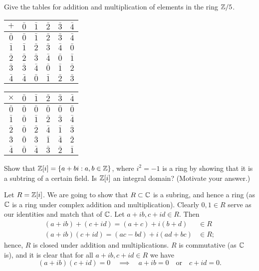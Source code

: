 \setcounter{question}{5}
\question Give the tables for addition and multiplication of elements in the ring $\mathbb{Z}/5$.
\begin{solution}
    \begin{center}
        \begin{tabular}{cccccc}
            \toprule
            $+$ & $\bar 0$ & $\bar 1$ & $\bar 2$ & $\bar 3$ & $\bar 4$ \\
            \midrule
            $\bar 0$ & $\bar 0$ & $\bar 1$ & $\bar 2$ & $\bar 3$ & $\bar 4$ \\
            $\bar 1$ & $\bar 1$ & $\bar 2$ & $\bar 3$ & $\bar 4$ & $\bar 0$ \\
            $\bar 2$ & $\bar 2$ & $\bar 3$ & $\bar 4$ & $\bar 0$ & $\bar 1$ \\
            $\bar 3$ & $\bar 3$ & $\bar 4$ & $\bar 0$ & $\bar 1$ & $\bar 2$ \\
            $\bar 4$ & $\bar 4$ & $\bar 0$ & $\bar 1$ & $\bar 2$ & $\bar 3$ \\
            \bottomrule
        \end{tabular}
        \begin{tabular}{cccccc}
            \toprule
            $\times$ & $\bar 0$ & $\bar 1$ & $\bar 2$ & $\bar 3$ & $\bar 4$ \\
            \midrule
            $\bar 0$ & $\bar 0$ & $\bar 0$ & $\bar 0$ & $\bar 0$ & $\bar 0$ \\
            $\bar 1$ & $\bar 0$ & $\bar 1$ & $\bar 2$ & $\bar 3$ & $\bar 4$ \\
            $\bar 2$ & $\bar 0$ & $\bar 2$ & $\bar 4$ & $\bar 1$ & $\bar 3$ \\
            $\bar 3$ & $\bar 0$ & $\bar 3$ & $\bar 1$ & $\bar 4$ & $\bar 2$ \\
            $\bar 4$ & $\bar 0$ & $\bar 4$ & $\bar 3$ & $\bar 2$ & $\bar 1$ \\
            \bottomrule
        \end{tabular}
    \end{center}
\end{solution}

\setcounter{question}{8}
\question Show that $\mathbb{Z}[i] = \{a + bi : a, b \in \mathbb{Z}\}$, where $i^2 = -1$ is a ring by showing that it is a subtring of a certain field. Is $\mathbb{Z}[i]$ an integral domain? (Motivate your answer.)
\begin{solution}
    Let $R = \mathbb{Z}[i]$.
    We are going to show that $R \subset \mathbb{C}$ is a subring, and hence a ring (as $\mathbb{C}$ is a ring under complex addition and multiplication).
    Clearly $0, 1 \in R$ serve as our identities and match that of $\mathbb{C}$.
    Let $a + ib, c + id \in R$. Then
    \begin{align*}
        (a + ib) + (c + id) = (a + c) + i(b + d) &\in R \\
        (a + ib)(c + id) = (ac - bd) + i(ad + bc)&\in R;
    \end{align*}
    hence, $R$ is closed under addition and multiplications.
    $R$ is commutative (as $\mathbb{C}$ is), and it is clear that for all
    $a + ib, c + id \in R$ we have
    \[ (a + ib)(c + id) = 0 \quad \implies \quad a + ib = 0 \quad\text{or}\quad c + id = 0. \]
\end{solution}

